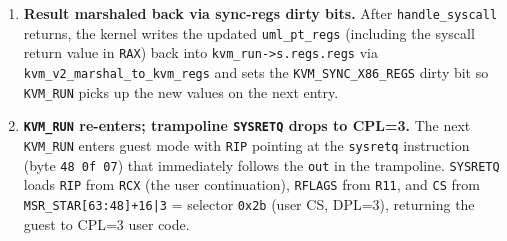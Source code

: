 \begin{enumerate}[leftmargin=2em]
  \item \textbf{Result marshaled back via sync-regs dirty bits.}
    After \texttt{handle\_syscall} returns, the \UML{} kernel writes
    the updated \texttt{uml\_pt\_regs} (including the syscall return value
    in \texttt{RAX}) back into \texttt{kvm\_run->s.regs.regs} via
    \texttt{kvm\_v2\_marshal\_to\_kvm\_regs} and sets the
    \texttt{KVM\_SYNC\_X86\_REGS} dirty bit so \texttt{KVM\_RUN}
    picks up the new values on the next entry.

  \item \textbf{\texttt{KVM\_RUN} re-enters; trampoline
        \texttt{SYSRETQ} drops to CPL=3.}
    The next \texttt{KVM\_RUN} enters guest mode with \texttt{RIP} pointing
    at the \texttt{sysretq} instruction (byte \texttt{48 0f 07}) that
    immediately follows the \texttt{out} in the trampoline.
    \texttt{SYSRETQ} loads \texttt{RIP} from \texttt{RCX} (the user
    continuation), \texttt{RFLAGS} from \texttt{R11}, and
    \texttt{CS} from \texttt{MSR\_STAR[63:48]+16|3} = selector
    \texttt{0x2b} (user CS, DPL=3), returning the guest to
    CPL=3 user code.
\end{enumerate}

